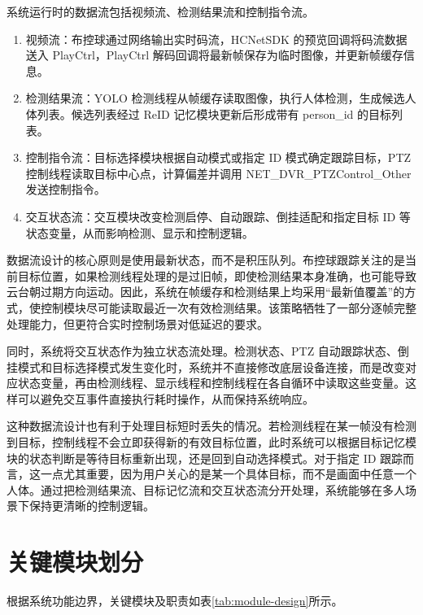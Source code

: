 系统运行时的数据流包括视频流、检测结果流和控制指令流。

\begin{enumerate}
    \item 视频流：布控球通过网络输出实时码流，HCNetSDK 的预览回调将码流数据送入 PlayCtrl，PlayCtrl 解码回调将最新帧保存为临时图像，并更新帧缓存信息。
    \item 检测结果流：YOLO 检测线程从帧缓存读取图像，执行人体检测，生成候选人体列表。候选列表经过 ReID 记忆模块更新后形成带有 person\_id 的目标列表。
    \item 控制指令流：目标选择模块根据自动模式或指定 ID 模式确定跟踪目标，PTZ 控制线程读取目标中心点，计算偏差并调用 NET\_DVR\_PTZControl\_Other 发送控制指令。
    \item 交互状态流：交互模块改变检测启停、自动跟踪、倒挂适配和指定目标 ID 等状态变量，从而影响检测、显示和控制逻辑。
\end{enumerate}

数据流设计的核心原则是使用最新状态，而不是积压队列。布控球跟踪关注的是当前目标位置，如果检测线程处理的是过旧帧，即使检测结果本身准确，也可能导致云台朝过期方向运动。因此，系统在帧缓存和检测结果上均采用“最新值覆盖”的方式，使控制模块尽可能读取最近一次有效检测结果。该策略牺牲了一部分逐帧完整处理能力，但更符合实时控制场景对低延迟的要求。

同时，系统将交互状态作为独立状态流处理。检测状态、PTZ 自动跟踪状态、倒挂模式和目标选择模式发生变化时，系统并不直接修改底层设备连接，而是改变对应状态变量，再由检测线程、显示线程和控制线程在各自循环中读取这些变量。这样可以避免交互事件直接执行耗时操作，从而保持系统响应。

这种数据流设计也有利于处理目标短时丢失的情况。若检测线程在某一帧没有检测到目标，控制线程不会立即获得新的有效目标位置，此时系统可以根据目标记忆模块的状态判断是等待目标重新出现，还是回到自动选择模式。对于指定 ID 跟踪而言，这一点尤其重要，因为用户关心的是某一个具体目标，而不是画面中任意一个人体。通过把检测结果流、目标记忆流和交互状态流分开处理，系统能够在多人场景下保持更清晰的控制逻辑。

\section{关键模块划分}

根据系统功能边界，关键模块及职责如表\ref{tab:module-design}所示。

